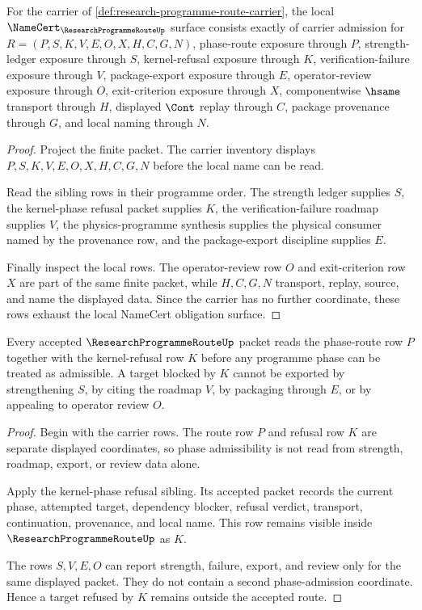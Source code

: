 \begin{theorem}
\label{thm:research-programme-route-namecert-obligations}
For the carrier of \autoref{def:research-programme-route-carrier}, the local $\NameCert_{\ResearchProgrammeRouteUp}$ surface consists exactly of carrier admission for $R=(P,S,K,V,E,O,X,H,C,G,N)$, phase-route exposure through $P$, strength-ledger exposure through $S$, kernel-refusal exposure through $K$, verification-failure exposure through $V$, package-export exposure through $E$, operator-review exposure through $O$, exit-criterion exposure through $X$, componentwise $\hsame$ transport through $H$, displayed $\Cont$ replay through $C$, package provenance through $G$, and local naming through $N$.
\end{theorem}
\begin{proof}
Project the finite packet. The carrier inventory displays $P,S,K,V,E,O,X,H,C,G,N$ before the local name can be read.

Read the sibling rows in their programme order. The strength ledger supplies $S$, the kernel-phase refusal packet supplies $K$, the verification-failure roadmap supplies $V$, the physics-programme synthesis supplies the physical consumer named by the provenance row, and the package-export discipline supplies $E$.

Finally inspect the local rows. The operator-review row $O$ and exit-criterion row $X$ are part of the same finite packet, while $H,C,G,N$ transport, replay, source, and name the displayed data. Since the carrier has no further coordinate, these rows exhaust the local NameCert obligation surface.
\end{proof}

\begin{theorem}
\label{thm:research-programme-route-phase-refusal}
Every accepted $\ResearchProgrammeRouteUp$ packet reads the phase-route row $P$ together with the kernel-refusal row $K$ before any programme phase can be treated as admissible. A target blocked by $K$ cannot be exported by strengthening $S$, by citing the roadmap $V$, by packaging through $E$, or by appealing to operator review $O$.
\end{theorem}
\begin{proof}
Begin with the carrier rows. The route row $P$ and refusal row $K$ are separate displayed coordinates, so phase admissibility is not read from strength, roadmap, export, or review data alone.

Apply the kernel-phase refusal sibling. Its accepted packet records the current phase, attempted target, dependency blocker, refusal verdict, transport, continuation, provenance, and local name. This row remains visible inside $\ResearchProgrammeRouteUp$ as $K$.

The rows $S,V,E,O$ can report strength, failure, export, and review only for the same displayed packet. They do not contain a second phase-admission coordinate. Hence a target refused by $K$ remains outside the accepted route.
\end{proof}

